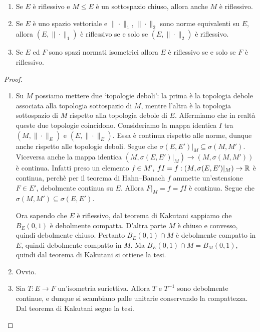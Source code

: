 \begin{lemma}
	\leavevmode
	\begin{enumerate}
		\item Se $E$ è riflessivo e $M \leq E$ è un sottospazio chiuso, allora anche $M$ è riflessivo.
		\item Se $E$ è uno spazio vettoriale e $\|\cdot\|_1$, $\|\cdot\|_2$ sono norme equivalenti su $E$, allora $(E, \|\cdot\|_1)$ è riflessivo se e solo se $(E, \|\cdot\|_2)$ è riflessivo.
		\item Se $E$ ed $F$ sono spazi normati isometrici allora $E$ è riflessivo se e solo se $F$ è riflessivo.
	\end{enumerate}
\end{lemma}
\begin{proof}
	\leavevmode
	\begin{enumerate}
		\item Su $M$ possiamo mettere due `topologie deboli': la prima è la topologia debole associata alla topologia sottospazio di $M$, mentre l'altra è la topologia sottospazio di $M$ rispetto alla topologia debole di $E$.
		Affermiamo che in realtà queste due topologie coincidono.
		Consideriamo la mappa identica $I$ tra $(M, \|\cdot\|_E)$ e $(E, \|\cdot\|_E)$.
		Essa è continua rispetto alle norme, dunque anche rispetto alle topologie deboli. Segue che $\sigma(E,E')\vert_M \subseteq \sigma(M,M')$.
		Viceversa anche la mappa identica $(M, \sigma(E,E')\vert_M) \to (M, \sigma(M,M'))$ è continua.
		Infatti preso un elemento $f \in M'$, $fI = f : (M, \sigma(E,E')\vert_M) \to \mathbb{R}$ è continua, perchè per il teorema di Hahn--Banach $f$ ammette un'estensione $F \in E'$, debolmente continua su $E$.
		Allora $F\vert_M = f = fI$ è continua. Segue che $\sigma(M,M') \subseteq \sigma(E,E')$.

		Ora sapendo che $E$ è riflessivo, dal teorema di Kakutani sappiamo che $B_E(0,1)$ è debolmente compatta. D'altra parte $M$ è chiuso e convesso, quindi debolmente chiuso. Pertanto $B_E(0,1) \cap M$ è debolmente compatto in $E$, quindi debolmente compatto in $M$. Ma $B_E(0, 1) \cap M = B_M(0,1)$, quindi dal teorema di Kakutani si ottiene la tesi.

		\item Ovvio.

		\item Sia $T:E \to F$ un'isometria suriettiva. Allora $T$ e $T^{-1}$ sono debolmente continue, e dunque si scambiano palle unitarie conservando la compattezza. Dal teorema di Kakutani segue la tesi.
	\end{enumerate}
\end{proof}

